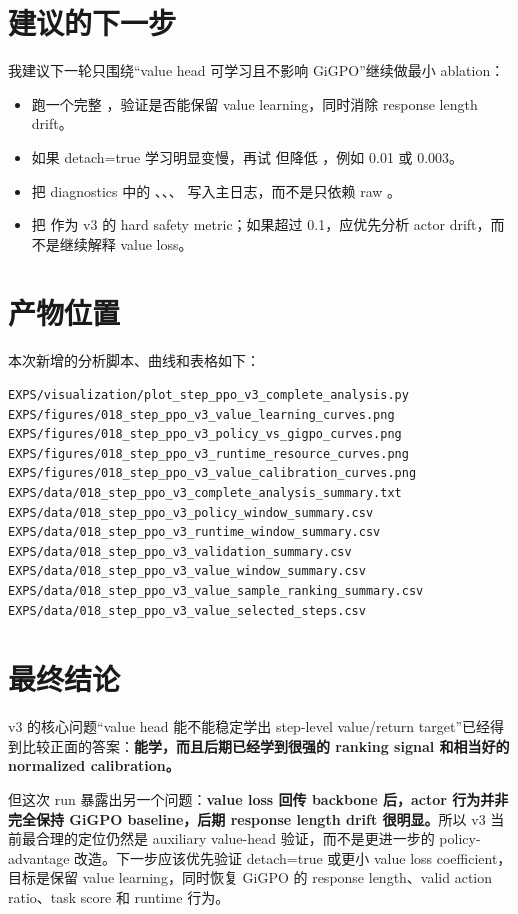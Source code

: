 \documentclass[10pt]{ctexart}
\begin{document}
\section{建议的下一步}
我建议下一轮只围绕“value head 可学习且不影响 GiGPO”继续做最小 ablation：
\begin{itemize}
  \item 跑一个完整 ，验证是否能保留 value learning，同时消除 response length drift。
  \item 如果 detach=true 学习明显变慢，再试  但降低 ，例如 0.01 或 0.003。
  \item 把 diagnostics 中的 、、、 写入主日志，而不是只依赖 raw 。
  \item 把  作为 v3 的 hard safety metric；如果超过 0.1，应优先分析 actor drift，而不是继续解释 value loss。
\end{itemize}

\section{产物位置}
本次新增的分析脚本、曲线和表格如下：
\begin{lstlisting}
EXPS/visualization/plot_step_ppo_v3_complete_analysis.py
EXPS/figures/018_step_ppo_v3_value_learning_curves.png
EXPS/figures/018_step_ppo_v3_policy_vs_gigpo_curves.png
EXPS/figures/018_step_ppo_v3_runtime_resource_curves.png
EXPS/figures/018_step_ppo_v3_value_calibration_curves.png
EXPS/data/018_step_ppo_v3_complete_analysis_summary.txt
EXPS/data/018_step_ppo_v3_policy_window_summary.csv
EXPS/data/018_step_ppo_v3_runtime_window_summary.csv
EXPS/data/018_step_ppo_v3_validation_summary.csv
EXPS/data/018_step_ppo_v3_value_window_summary.csv
EXPS/data/018_step_ppo_v3_value_sample_ranking_summary.csv
EXPS/data/018_step_ppo_v3_value_selected_steps.csv
\end{lstlisting}

\section{最终结论}
v3 的核心问题“value head 能不能稳定学出 step-level value/return target”已经得到比较正面的答案：\textbf{能学，而且后期已经学到很强的 ranking signal 和相当好的 normalized calibration。}

但这次  run 暴露出另一个问题：\textbf{value loss 回传 backbone 后，actor 行为并非完全保持 GiGPO baseline，后期 response length drift 很明显。}所以 v3 当前最合理的定位仍然是 auxiliary value-head 验证，而不是更进一步的 policy-advantage 改造。下一步应该优先验证 detach=true 或更小 value loss coefficient，目标是保留 value learning，同时恢复 GiGPO 的 response length、valid action ratio、task score 和 runtime 行为。
\end{document}
